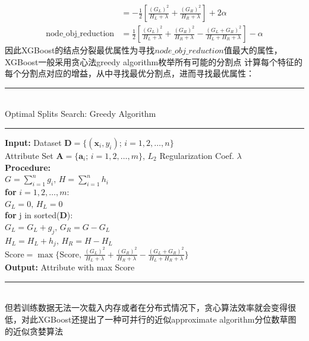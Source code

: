 \documentclass[a4paper]{article}
\begin{document}
\begin{itemize}
\begin{align*}
						& = -\frac{1}{2}\left[\frac{(G_L)^2}{H_L+\lambda}+\frac{(G_R)^2}{H_R+\lambda}\right]+2\alpha\\
				\text{node\_obj\_reduction}
						& = \frac{1}{2}\left[\frac{(G_L)^2}{H_L+\lambda}+\frac{(G_R)^2}{H_R+\lambda}-\frac{(G_L+G_R)^2}{H_L+H_R+\lambda}\right]-\alpha
			\end{align*}
			因此XGBoost的结点分裂最优属性为寻找$node\_obj\_reduction$值最大的属性，XGBoost一般采用贪心法greedy algorithm枚举所有可能的分割点
			计算每个特征的每个分割点对应的增益，从中寻找最优分割点，进而寻找最优属性：\\
			\noindent\rule[0.10\baselineskip]{\textwidth}{0.75pt}\\
			Optimal Splits Search: Greedy Algorithm\\
			\noindent\rule[0.10\baselineskip]{\textwidth}{0.5pt}
				\textbf{Input:}	Dataset $\textbf{D}=\{(\textbf{x}_i,y_i);\, i = 1,2,\dots, n\}$\\
				\hspace*{32pt}	Attribute Set $\textbf{A} = \{\textbf{a}_i;\,i=1,2,\dots,m\}$, $L_2$ Regularization Coef. $\lambda$\\
				\textbf{Procedure:}\\
				\hspace*{32pt}	$G = \sum_{i=1}^{n}g_i,\,H = \sum_{i=1}^{n}h_i$\\
				\hspace*{32pt}	\textbf{for} $i = 1,2,\dots, m$:\\
				\hspace*{48pt}	$G_L = 0, \, H_L = 0$\\
				\hspace*{48pt}	\textbf{for} j in sorted(\textbf{D}):\\
				\hspace*{64pt}	$G_L = G_L+g_j,\, G_R = G - G_L$\\
				\hspace*{64pt}  $H_L = H_L+h_j,\, H_R = H - H_L$\\
				\hspace*{48pt}  $\text{Score} = \max\{\text{Score},\,\frac{(G_L)^2}{H_L+\lambda}+\frac{(G_R)^2}{H_R+\lambda}- \frac{(G_L+G_R)^2}{H_L+H_R+\lambda}\}$\\
				\textbf{Output:} Attribute  with max Score\\
			\noindent\rule[0.10\baselineskip]{\textwidth}{0.75pt}\\
			但若训练数据无法一次载入内存或者在分布式情况下，贪心算法效率就会变得很低，对此XGBoost还提出了一种可并行的近似approximate algorithm分位数草图的近似贪婪算法

\end{itemize}
\end{document}

